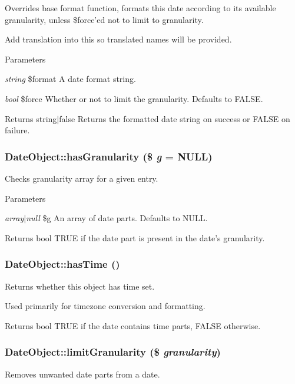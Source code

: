 Overrides base format function, formats this date according to its available granularity, unless \$force'ed not to limit to granularity.

Add translation into this so translated names will be provided.


\begin{DoxyParams}{Parameters}
\item[{\em string}]\$format A date format string. \item[{\em bool}]\$force Whether or not to limit the granularity. Defaults to FALSE.\end{DoxyParams}
\begin{DoxyReturn}{Returns}
string$|$false Returns the formatted date string on success or FALSE on failure. 
\end{DoxyReturn}
\hypertarget{classDateObject_a7b8143706b36b592b071b76ddf14d9ff}{
\subsubsection[{hasGranularity}]{\setlength{\rightskip}{0pt plus 5cm}DateObject::hasGranularity (\$ {\em g} = {\ttfamily NULL})}}
\label{classDateObject_a7b8143706b36b592b071b76ddf14d9ff}
Checks granularity array for a given entry.


\begin{DoxyParams}{Parameters}
\item[{\em array$|$null}]\$g An array of date parts. Defaults to NULL.\end{DoxyParams}
\begin{DoxyReturn}{Returns}
bool TRUE if the date part is present in the date's granularity. 
\end{DoxyReturn}
\hypertarget{classDateObject_aff6e57eec29c7706d59c6dc7e0d8e9f9}{
\subsubsection[{hasTime}]{\setlength{\rightskip}{0pt plus 5cm}DateObject::hasTime ()}}
\label{classDateObject_aff6e57eec29c7706d59c6dc7e0d8e9f9}
Returns whether this object has time set.

Used primarily for timezone conversion and formatting.

\begin{DoxyReturn}{Returns}
bool TRUE if the date contains time parts, FALSE otherwise. 
\end{DoxyReturn}
\hypertarget{classDateObject_a38ea3db16bafb0f1b10acaeb0ee74f97}{
\subsubsection[{limitGranularity}]{\setlength{\rightskip}{0pt plus 5cm}DateObject::limitGranularity (\$ {\em granularity})}}
\label{classDateObject_a38ea3db16bafb0f1b10acaeb0ee74f97}
Removes unwanted date parts from a date.

